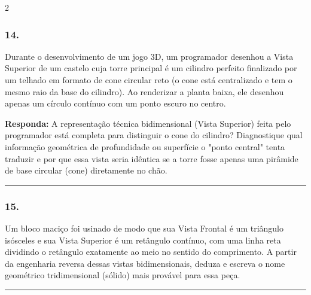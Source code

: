 \documentclass[twoside, 10pt, a4paper]{article}
\newlength{\espacoPreQuestao}\setlength{\espacoPreQuestao}{0.1cm}
\newlength{\espacoQuestao}\setlength{\espacoQuestao}{0.2cm}
\begin{document}
\begin{multicols*}{2}
\subsubsection*{14.} Durante o desenvolvimento de um jogo 3D, um programador desenhou a Vista Superior de um castelo cuja torre principal é um cilindro perfeito finalizado por um telhado em formato de cone circular reto (o cone está centralizado e tem o mesmo raio da base do cilindro). Ao renderizar a planta baixa, ele desenhou apenas um círculo contínuo com um ponto escuro no centro.
\begin{boxresponda}
\textbf{Responda:} A representação técnica bidimensional (Vista Superior) feita pelo programador está completa para distinguir o cone do cilindro? Diagnostique qual informação geométrica de profundidade ou superfície o "ponto central" tenta traduzir e por que essa vista seria idêntica se a torre fosse apenas uma pirâmide de base circular (cone) diretamente no chão.
\end{boxresponda}
\par\vspace{\espacoQuestao}

\noindent\textcolor{CorLinha}{\rule{\linewidth}{0.5pt}} 
\par\vspace{\espacoPreQuestao}
\subsubsection*{15.} Um bloco maciço foi usinado de modo que sua Vista Frontal é um triângulo isósceles e sua Vista Superior é um retângulo contínuo, com uma linha reta dividindo o retângulo exatamente ao meio no sentido do comprimento. A partir da engenharia reversa dessas vistas bidimensionais, deduza e escreva o nome geométrico tridimensional (sólido) mais provável para essa peça.
\par\vspace{\espacoQuestao}
\noindent\textcolor{CorLinha}{\rule{\linewidth}{0.5pt}} 
\par\vspace{\espacoPreQuestao}

\end{multicols*}
\end{document}
